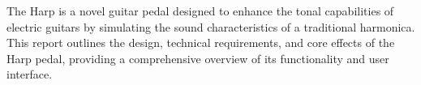 The Harp is a novel guitar pedal designed to enhance the tonal capabilities of electric guitars by simulating the sound characteristics of a traditional harmonica. This report outlines the design, technical requirements, and core effects of the Harp pedal, providing a comprehensive overview of its functionality and user interface.
